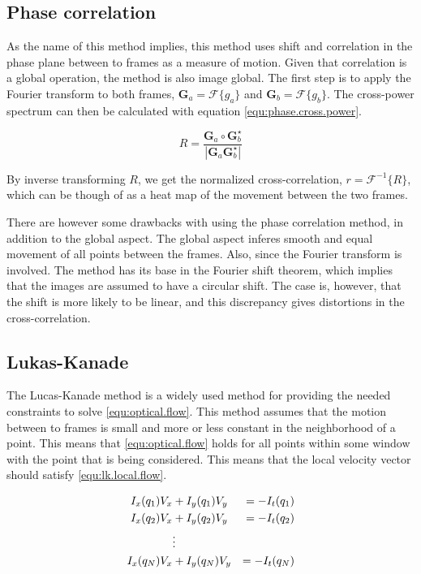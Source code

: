 \subsection{Phase correlation}
As the name of this method implies, this method uses shift and correlation in the phase plane between to frames as a measure of motion. Given that correlation is a global operation,
the method is also image global. The first step is to apply the Fourier transform to both frames, $\textbf{G}_a = \mathcal{F}\{g_a\}$ and $\textbf{G}_b = \mathcal{F}\{g_b\}$. The cross-power spectrum 
can then be calculated with equation \eqref{equ:phase.cross.power}.

\begin{equation}\label{equ:phase.cross.power}
R = \frac{\textbf{G}_a \circ \textbf{G}_b^\star}{|\textbf{G}_a \textbf{G}_b^\star|}
\end{equation}

By inverse transforming $R$, we get the normalized cross-correlation, $r = \mathcal{F}^{-1}\{R\}$, which can be though of as a 
heat map of the movement between the two frames.

There are however some drawbacks with using the phase correlation method, in addition to the global aspect. The global aspect 
inferes smooth and equal movement of all points between the frames. Also, since the Fourier transform is involved. The method has its base 
in the Fourier shift theorem, which implies that the images are assumed to have a circular shift. The case is, however, that the shift 
is more likely to be linear, and this discrepancy gives distortions in the cross-correlation.

\subsection{Lukas-Kanade}
The Lucas-Kanade method is a widely used method for providing the needed constraints to solve \eqref{equ:optical.flow}. This method assumes that 
the motion between to frames is small and more or less constant in the neighborhood of a point. This means that \eqref{equ:optical.flow} holds for all points within some window
with the point that is being considered. This means that the local velocity vector should satisfy \eqref{equ:lk.local.flow}.

\begin{align}\label{equ:lk.local.flow}
I_x(q_1)V_x &+ I_y(q_1)V_y	&= -I_t(q_1) \\
I_x(q_2)V_x &+ I_y(q_2)V_y 	&= -I_t(q_2) \notag \\
& \vdots \notag \\
I_x(q_N)V_x &+ I_y(q_N)V_y 	&= -I_t(q_N) \notag
\end{align}

